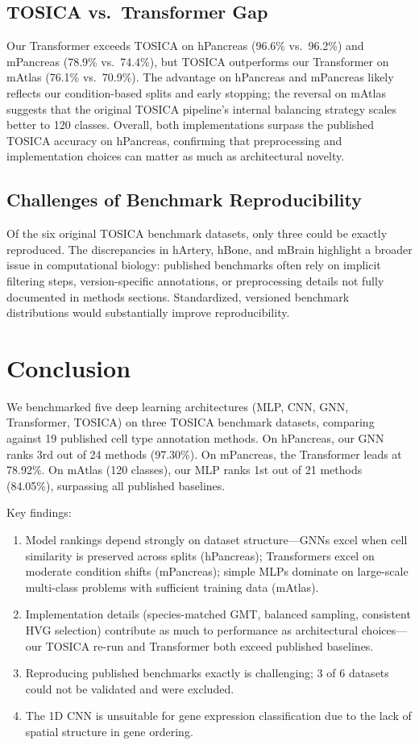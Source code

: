 \documentclass[11pt,letterpaper]{article}
\begin{document}
\subsection{TOSICA vs.\ Transformer Gap}
Our Transformer exceeds TOSICA on hPancreas (96.6\% vs.\ 96.2\%) and mPancreas
(78.9\% vs.\ 74.4\%), but TOSICA outperforms our Transformer on mAtlas (76.1\%
vs.\ 70.9\%). The advantage on hPancreas and mPancreas likely reflects our
condition-based splits and early stopping; the reversal on mAtlas suggests that
the original TOSICA pipeline's internal balancing strategy scales better to
120 classes. Overall, both implementations surpass the published TOSICA accuracy
on hPancreas, confirming that preprocessing and implementation choices can
matter as much as architectural novelty.

\subsection{Challenges of Benchmark Reproducibility}
Of the six original TOSICA benchmark datasets, only three could be exactly
reproduced. The discrepancies in hArtery, hBone, and mBrain highlight a broader
issue in computational biology: published benchmarks often rely on implicit
filtering steps, version-specific annotations, or preprocessing details not
fully documented in methods sections. Standardized, versioned benchmark
distributions would substantially improve reproducibility.

\section{Conclusion}

We benchmarked five deep learning architectures (MLP, CNN, GNN, Transformer,
TOSICA) on three TOSICA benchmark datasets, comparing against 19 published cell
type annotation methods. On hPancreas, our GNN ranks 3rd out of 24 methods
(97.30\%). On mPancreas, the Transformer leads at 78.92\%. On mAtlas (120
classes), our MLP ranks 1st out of 21 methods (84.05\%), surpassing all
published baselines.

Key findings:
\begin{enumerate}
    \item Model rankings depend strongly on dataset structure---GNNs excel
    when cell similarity is preserved across splits (hPancreas); Transformers
    excel on moderate condition shifts (mPancreas); simple MLPs dominate on
    large-scale multi-class problems with sufficient training data (mAtlas).
    \item Implementation details (species-matched GMT, balanced sampling,
    consistent HVG selection) contribute as much to performance as architectural
    choices---our TOSICA re-run and Transformer both exceed published baselines.
    \item Reproducing published benchmarks exactly is challenging; 3 of 6
    datasets could not be validated and were excluded.
    \item The 1D CNN is unsuitable for gene expression classification due to
    the lack of spatial structure in gene ordering.
\end{enumerate}
\end{document}

